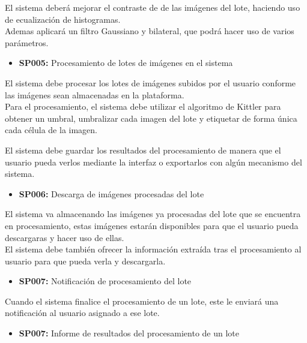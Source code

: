 \documentclass{scrreprt}
\begin{document}
El sistema deberá mejorar el contraste de de las imágenes del lote, haciendo uso de ecualización de histogramas.\\

Ademas aplicará un filtro Gaussiano y bilateral, que podrá hacer uso de varios parámetros.\\ 

\begin{itemize}
\item \textbf{SP005:} Procesamiento de lotes de imágenes en el sistema
\end{itemize}

El sistema debe procesar los lotes de imágenes subidos por el usuario conforme las imágenes sean almacenadas en la plataforma.\\

Para el procesamiento, el sistema debe utilizar el algoritmo de Kittler para obtener un umbral, umbralizar cada imagen del lote y etiquetar de forma única cada célula de la imagen.

El sistema debe guardar los resultados del procesamiento de manera que el usuario pueda verlos mediante la interfaz o exportarlos con algún mecanismo del sistema.\\

\begin{itemize}
\item  \textbf{SP006:} Descarga de imágenes procesadas del lote
\end{itemize}

El sistema va almacenando las imágenes ya procesadas del lote que se encuentra en procesamiento, estas imágenes estarán disponibles para que el usuario pueda descargaras y hacer uso de ellas.\\

El sistema debe también ofrecer la información extraída tras el procesamiento al usuario para que pueda verla y descargarla.\\

\begin{itemize}
\item  \textbf{SP007:} Notificación de procesamiento del lote
\end{itemize}

Cuando el sistema finalice el procesamiento de un lote, este le enviará una notificación al usuario asignado a ese lote.\\

\begin{itemize}
\item  \textbf{SP007:} Informe de resultados del procesamiento de un lote
\end{itemize}
\end{document}
